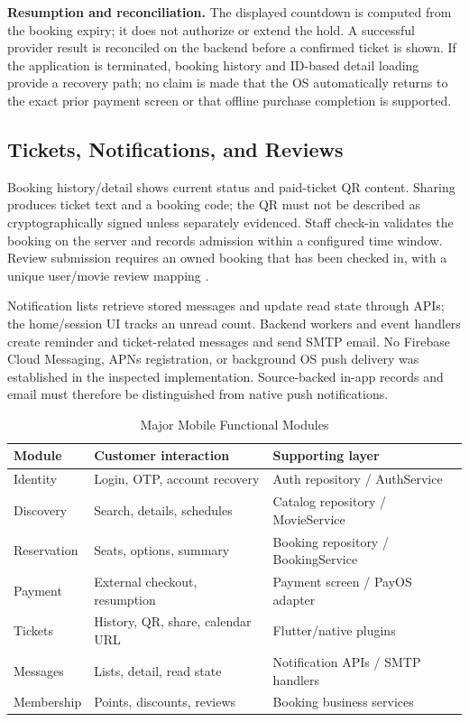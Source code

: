 \documentclass[conference]{IEEEtran}
\begin{document}
\textbf{Resumption and reconciliation.} The displayed countdown is computed from the booking expiry; it does not
authorize or extend the hold. A successful provider result is reconciled on
the backend before a confirmed ticket is shown. If the application is
terminated, booking history and ID-based detail loading provide a recovery
path; no claim is made that the OS automatically returns to the exact prior
payment screen or that offline purchase completion is supported.

\subsection{Tickets, Notifications, and Reviews}
Booking history/detail shows current status and paid-ticket QR content.
Sharing produces ticket text and a booking code; the QR must not be described
as cryptographically signed unless separately evidenced. Staff check-in
validates the booking on the server and records admission within a configured
time window. Review submission requires an owned booking that has been
checked in, with a unique user/movie review mapping \cite{client,booking}.

Notification lists retrieve stored messages and update read state through
APIs; the home/session UI tracks an unread count. Backend workers and event
handlers create reminder and ticket-related messages and send SMTP email.
No Firebase Cloud Messaging, APNs registration, or background OS push delivery
was established in the inspected implementation. Source-backed in-app records
and email must therefore be distinguished from native push notifications.

\begin{table}[t]
\caption{Major Mobile Functional Modules}\label{tab:modules}
\centering\footnotesize
\begin{tabularx}{\columnwidth}{@{}lYY@{}}\toprule
\textbf{Module} & \textbf{Customer interaction} & \textbf{Supporting layer}\\\midrule
Identity & Login, OTP, account recovery & Auth repository / AuthService\\
Discovery & Search, details, schedules & Catalog repository / MovieService\\
Reservation & Seats, options, summary & Booking repository / BookingService\\
Payment & External checkout, resumption & Payment screen / PayOS adapter\\
Tickets & History, QR, share, calendar URL & Flutter/native plugins\\
Messages & Lists, detail, read state & Notification APIs / SMTP handlers\\
Membership & Points, discounts, reviews & Booking business services\\\bottomrule
\end{tabularx}
\end{table}
\end{document}
